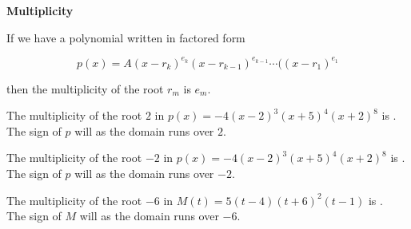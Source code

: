 \documentclass{ximera}
\author{Lee Wayand}
\begin{document}
\begin{exercise}






\begin{idea} \textbf{\textcolor{blue!55!black}{Multiplicity}}


If we have a polynomial written in factored form

\[
p(x) = A (x-r_k)^{e_k} (x-r_{k-1})^{e_{k-1}}  \cdots ((x-r_1)^{e_1}
\]

then the multiplicity of the root $r_m$ is $e_m$. \\





\end{idea}



\begin{question}


The multiplicity of the root $2$ in $p(x) = -4 (x - 2)^3 (x + 5)^4 (x + 2)^8$ is . \\



The sign of $p$ will  as the domain runs over $2$.

\end{question}





\begin{question}


The multiplicity of the root $-2$ in $p(x) = -4 (x - 2)^3 (x + 5)^4 (x + 2)^8$ is . \\



The sign of $p$ will  as the domain runs over $-2$.

\end{question}





\begin{question}


The multiplicity of the root $-6$ in $M(t) = 5(t - 4) (t + 6)^2 (t - 1)$ is . \\


The sign of $M$ will  as the domain runs over $-6$.




\end{question}
\end{exercise}
\end{document}
